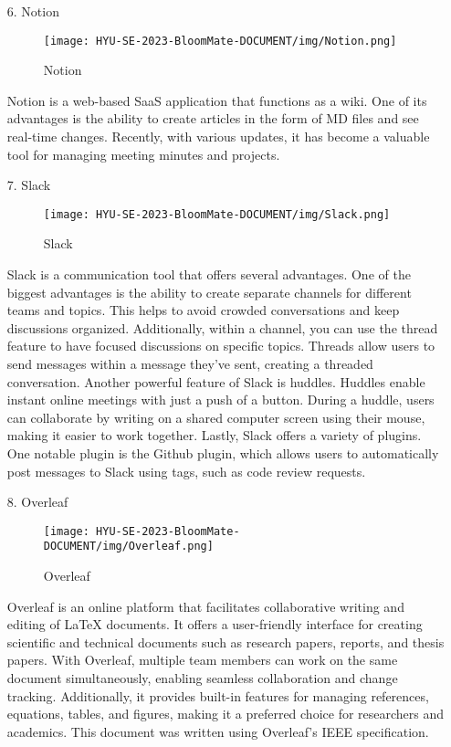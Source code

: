 \documentclass[conference, a4paper]{IEEEtran}
\begin{document}
\begin{enumerate}
    \item[6.]Notion
    \begin{figure}[h]
    \centering
    \texttt{[image: HYU-SE-2023-BloomMate-DOCUMENT/img/Notion.png]}
    \label{fig:Notion}
    \caption{Notion} 
    \end{figure}
    \item[]Notion is a web-based SaaS application that functions as a wiki. One of its advantages is the ability to create articles in the form of MD files and see real-time changes. Recently, with various updates, it has become a valuable tool for managing meeting minutes and projects.\\


    \item[7.]Slack
    \begin{figure}[h]
    \centering
    \texttt{[image: HYU-SE-2023-BloomMate-DOCUMENT/img/Slack.png]}
    \label{fig:Slack}
    \caption{Slack} 
    \end{figure}
    \item[]Slack is a communication tool that offers several advantages. One of the biggest advantages is the ability to create separate channels for different teams and topics. This helps to avoid crowded conversations and keep discussions organized. Additionally, within a channel, you can use the thread feature to have focused discussions on specific topics. Threads allow users to send messages within a message they've sent, creating a threaded conversation. Another powerful feature of Slack is huddles. Huddles enable instant online meetings with just a push of a button. During a huddle, users can collaborate by writing on a shared computer screen using their mouse, making it easier to work together. Lastly, Slack offers a variety of plugins. One notable plugin is the Github plugin, which allows users to automatically post messages to Slack using tags, such as code review requests.\\

\newpage

    \item[8.]Overleaf
    \begin{figure}[h]
    \centering
    \texttt{[image: HYU-SE-2023-BloomMate-DOCUMENT/img/Overleaf.png]}
    \label{fig:Overleaf}
    \caption{Overleaf} 
    \end{figure}
    \item[]Overleaf is an online platform that facilitates collaborative writing and editing of LaTeX documents. It offers a user-friendly interface for creating scientific and technical documents such as research papers, reports, and thesis papers. With Overleaf, multiple team members can work on the same document simultaneously, enabling seamless collaboration and change tracking. Additionally, it provides built-in features for managing references, equations, tables, and figures, making it a preferred choice for researchers and academics. This document was written using Overleaf's IEEE specification.\\



\end{enumerate}
\end{document}
